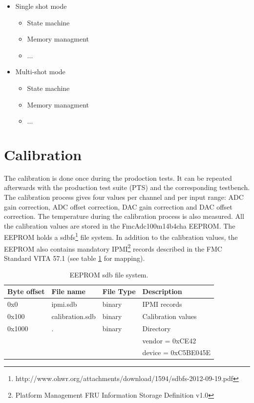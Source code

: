 \documentclass[11pt,a4paper]{article}
\begin{document}
\begin{itemize}

\item Single shot mode
  \begin{itemize}
  \item State machine
  \item Memory managment
  \item ...
  \end{itemize}

\item Multi-shot mode
  \begin{itemize}
  \item State machine
  \item Memory managment
  \item ...
  \end{itemize}
\end{itemize}




\newpage
\section{Calibration}

The calibration is done once during the prodoction tests.
It can be repeated afterwards with the production test suite (PTS) and the corresponding testbench.
The calibration process gives four values per channel and per input range:
ADC gain correction, ADC offset correction, DAC gain correction and DAC offset correction.
The temperature during the calibration process is also measured.
All the calibration values are stored in the FmcAdc100m14b4cha EEPROM.
The EEPROM holds a sdbfs\footnote{http://www.ohwr.org/attachments/download/1594/sdbfs-2012-09-19.pdf} file system.
In addition to the calibration values, the EEPROM also contains mandatory IPMI\footnote{Platform Management FRU Information Storage Definition v1.0} 
records described in the FMC Standard VITA 57.1 (see table \ref{tab:eeprom_sdbfs} for mapping).

\begin{table}[ht]
  \centering
  \begin{tabularx}{\textwidth}{| l | l | l | X |}
    \hline
    \textbf{Byte offset} & \textbf{File name}  & \textbf{File Type} & \textbf{Description} \\
    \hline
    0x0 & ipmi.sdb & binary & IPMI records \\
    \hline
    0x100 & calibration.sdb & binary & Calibration values \\
    \hline
    0x1000 & . & binary & Directory \\
    & & & vendor = 0xCE42 \\
    & & & device = 0xC5BE045E \\
    \hline
  \end{tabularx}
  \caption{EEPROM sdb file system.}
  \label{tab:eeprom_sdbfs}
\end{table}
\end{document}
